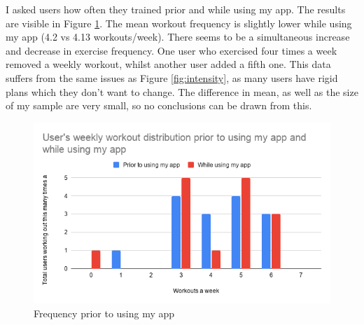 \documentclass{l4proj}
\begin{document}
I asked users how often they trained prior and while using my app. The results are visible in Figure \ref{fig:workout_frequencies}. The mean workout frequency is slightly lower while using my app (4.2 vs 4.13 workouts/week). There seems to be a simultaneous increase and decrease in exercise frequency. One user who exercised four times a week removed a weekly workout, whilst another user added a fifth one. This data suffers from the same issues as Figure \ref{fig:intensity}, as many users have rigid plans which they don't want to change. The difference in mean, as well as the size of my sample are very small, so no conclusions can be drawn from this.
\begin{figure}[H]
    \centering
    \includegraphics[width=1.0\linewidth]{user_workout_distribution.png}    
    \caption{Frequency prior to using my app}
    \label{fig:workout_frequencies} 
\end{figure}
\end{document}
